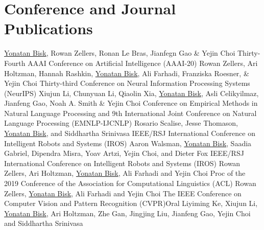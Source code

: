 \documentclass[10pt,letter]{moderncv}
\newcommand{\YB}{\underline{Yonatan Bisk}}
\begin{document}
\section{Conference and Journal Publications}
  {\href{https://arxiv.org/abs/1911.11641}{\color{linkcolor}{PIQA: Reasoning about Physical Commonsense in Natural Language}}}
  {\YB{}, Rowan Zellers, Ronan Le Bras, Jianfegn Gao \& Yejin Choi}
  {Thirty-Fourth AAAI Conference on Artificial Intelligence (AAAI-20)}{}{}
  {\href{https://arxiv.org/abs/1905.12616}{\color{linkcolor}{Defending Against Neural Fake News}}}
  {Rowan Zellers, Ari Holtzman, Hannah Rashkin, \YB{}, Ali Farhadi, Franziska Roesner, \& Yejin Choi}
  {Thirty-third Conference on Neural Information Processing Systems (NeurIPS)}{}{}
\pub{--}
  {\href{https://arxiv.org/abs/1909.02244}{\color{linkcolor}{Robust Navigation with Language Pre-training and Stochastic Sampling}}}
  {Xiujun Li, Chunyuan Li, Qiaolin Xia, \YB{}, Asli Celikyilmaz, Jianfeng Gao, Noah A. Smith \& Yejin Choi}
  {Conference on Empirical Methods in Natural Language Processing and 9th International Joint Conference on Natural Language Processing (EMNLP-IJCNLP)}{}{}
\pub{--}
  {\href{https://arxiv.org/abs/1904.01650}{\color{linkcolor}{Improving Robot Success Detection using Static Object Data}}}
  {Rosario Scalise, Jesse Thomason, \YB{}, and Siddhartha Srinivasa}
  {IEEE/RSJ International Conference on Intelligent Robots and Systems (IROS)}{}{}
\pub{--}
  {\href{https://arxiv.org/abs/1811.08824}{\color{linkcolor}{Early Fusion for Goal Directed Robotic Vision}}}
  {Aaron Walsman, \YB{}, Saadia Gabriel, Dipendra Misra, Yoav Artzi, Yejin Choi, and Dieter Fox}
  {IEEE/RSJ International Conference on Intelligent Robots and Systems (IROS)}{}{}
\pub{--}
  {\href{https://arxiv.org/abs/1905.07830}{\color{linkcolor}{HellaSwag: Can a Machine Really Finish Your Sentence?}}}
  {Rowan Zellers, Ari Holtzman, \YB{}, Ali Farhadi and Yejin Choi}
  {Proc of the 2019 Conference of the Association for Computational Linguistics (ACL)}{}{}
\pub{--}
  {\href{http://visualcommonsense.com/}{\color{linkcolor}{From Recognition to Cognition: Visual Commonsense Reasoning}}}
  {Rowan Zellers, \YB{}, Ali Farhadi and Yejin Choi}
  {The IEEE Conference on Computer Vision and Pattern Recognition (CVPR)}{Oral}{}
\pub{--}
  {\href{https://arxiv.org/abs/1903.02547}{\color{linkcolor}{Tactical Rewind: Self-Correction via Backtracking in Vision-and-Language Navigation}}}
  {Liyiming Ke, Xiujun Li, \YB{}, Ari Holtzman, Zhe Gan, Jingjing Liu, Jianfeng Gao, Yejin Choi and Siddhartha Srinivasa}
\end{document}
